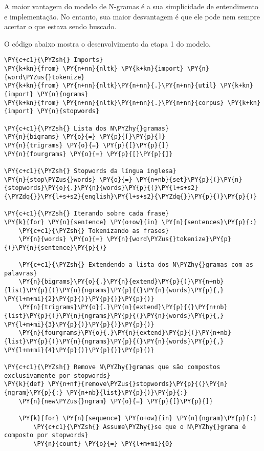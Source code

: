 \documentclass[a4paper,11pt,final]{article}
\begin{document}
A maior vantagem do modelo de N-gramas é a sua simplicidade de entendimento e implementação.
No entanto, sua maior desvantagem é que ele pode nem sempre acertar o que estava sendo buscado.

O código abaixo mostra o desenvolvimento da etapa 1 do modelo.



\begin{Verbatim}[commandchars=\\\{\},frame=single,fontsize=\small, xleftmargin=0.5em]
\PY{c+c1}{\PYZsh{} Imports}
\PY{k+kn}{from} \PY{n+nn}{nltk} \PY{k+kn}{import} \PY{n}{word\PYZus{}tokenize}
\PY{k+kn}{from} \PY{n+nn}{nltk}\PY{n+nn}{.}\PY{n+nn}{util} \PY{k+kn}{import} \PY{n}{ngrams}
\PY{k+kn}{from} \PY{n+nn}{nltk}\PY{n+nn}{.}\PY{n+nn}{corpus} \PY{k+kn}{import} \PY{n}{stopwords}

\PY{c+c1}{\PYZsh{} Lista dos N\PYZhy{}gramas}
\PY{n}{bigrams} \PY{o}{=} \PY{p}{[}\PY{p}{]}
\PY{n}{trigrams} \PY{o}{=} \PY{p}{[}\PY{p}{]}
\PY{n}{fourgrams} \PY{o}{=} \PY{p}{[}\PY{p}{]}

\PY{c+c1}{\PYZsh{} Stopwords da língua inglesa}
\PY{n}{stop\PYZus{}words} \PY{o}{=} \PY{n+nb}{set}\PY{p}{(}\PY{n}{stopwords}\PY{o}{.}\PY{n}{words}\PY{p}{(}\PY{l+s+s2}{\PYZdq{}}\PY{l+s+s2}{english}\PY{l+s+s2}{\PYZdq{}}\PY{p}{)}\PY{p}{)}

\PY{c+c1}{\PYZsh{} Iterando sobre cada frase}
\PY{k}{for} \PY{n}{sentence} \PY{o+ow}{in} \PY{n}{sentences}\PY{p}{:}
    \PY{c+c1}{\PYZsh{} Tokenizando as frases}
    \PY{n}{words} \PY{o}{=} \PY{n}{word\PYZus{}tokenize}\PY{p}{(}\PY{n}{sentence}\PY{p}{)}
    
    \PY{c+c1}{\PYZsh{} Extendendo a lista dos N\PYZhy{}gramas com as palavras}
    \PY{n}{bigrams}\PY{o}{.}\PY{n}{extend}\PY{p}{(}\PY{n+nb}{list}\PY{p}{(}\PY{n}{ngrams}\PY{p}{(}\PY{n}{words}\PY{p}{,} \PY{l+m+mi}{2}\PY{p}{)}\PY{p}{)}\PY{p}{)}
    \PY{n}{trigrams}\PY{o}{.}\PY{n}{extend}\PY{p}{(}\PY{n+nb}{list}\PY{p}{(}\PY{n}{ngrams}\PY{p}{(}\PY{n}{words}\PY{p}{,} \PY{l+m+mi}{3}\PY{p}{)}\PY{p}{)}\PY{p}{)}
    \PY{n}{fourgrams}\PY{o}{.}\PY{n}{extend}\PY{p}{(}\PY{n+nb}{list}\PY{p}{(}\PY{n}{ngrams}\PY{p}{(}\PY{n}{words}\PY{p}{,} \PY{l+m+mi}{4}\PY{p}{)}\PY{p}{)}\PY{p}{)}   

\PY{c+c1}{\PYZsh{} Remove N\PYZhy{}gramas que são compostos exclusivamente por stopwords}
\PY{k}{def} \PY{n+nf}{remove\PYZus{}stopwords}\PY{p}{(}\PY{n}{ngram}\PY{p}{:} \PY{n+nb}{list}\PY{p}{)}\PY{p}{:}
    \PY{n}{new\PYZus{}ngram} \PY{o}{=} \PY{p}{[}\PY{p}{]}

    \PY{k}{for} \PY{n}{sequence} \PY{o+ow}{in} \PY{n}{ngram}\PY{p}{:}
        \PY{c+c1}{\PYZsh{} Assume\PYZhy{}se que o N\PYZhy{}grama é composto por stopwords}
        \PY{n}{count} \PY{o}{=} \PY{l+m+mi}{0}


\end{Verbatim}
\end{document}

